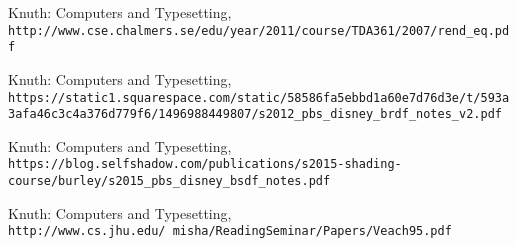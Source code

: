 \begin{thebibliography}{9}

	Knuth: Computers and Typesetting,
	\\\texttt{http://www.cse.chalmers.se/edu/year/2011/course/TDA361/2007/rend\_eq.pdf}
	
	Knuth: Computers and Typesetting,
	\\\texttt{https://static1.squarespace.com/static/58586fa5ebbd1a60e7d76d3e/t/593a3afa46c3c4a376d779f6/1496988449807/s2012\_pbs\_disney\_brdf\_notes\_v2.pdf}
	
	Knuth: Computers and Typesetting,
	\\\texttt{https://blog.selfshadow.com/publications/s2015-shading-course/burley/s2015\_pbs\_disney\_bsdf\_notes.pdf}
	
	Knuth: Computers and Typesetting,
	\\\texttt{http://www.cs.jhu.edu/~misha/ReadingSeminar/Papers/Veach95.pdf}
	
\end{thebibliography}











